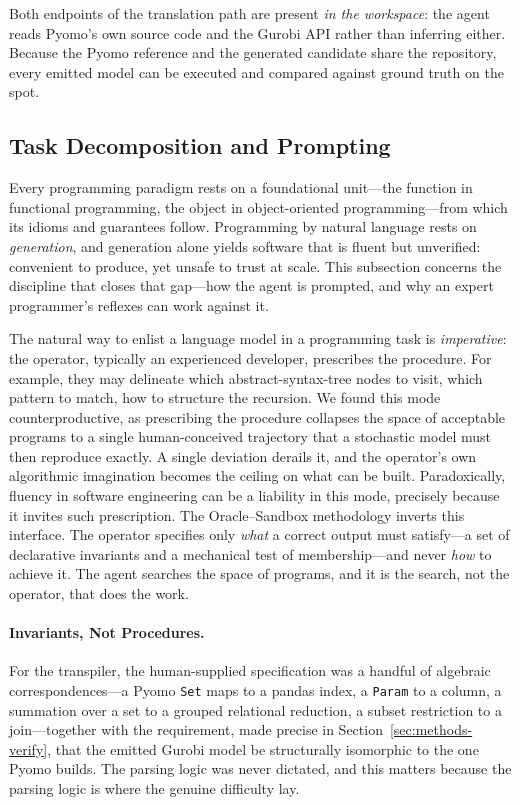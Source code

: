 \documentclass[runningheads]{llncs}
\begin{document}
Both endpoints of the translation path are present \emph{in the workspace}: the agent reads Pyomo's own source code and the Gurobi API rather than inferring either. Because the Pyomo reference and the generated candidate share the repository, every emitted model can be executed and compared against ground truth on the spot.

\subsection{Task Decomposition and Prompting}
\label{sec:methods-decomp}

Every programming paradigm rests on a foundational unit---the function in functional programming, the object in object-oriented programming---from which its idioms and guarantees follow. Programming by natural language rests on \emph{generation}, and generation alone yields software that is fluent but unverified: convenient to produce, yet unsafe to trust at scale. This subsection concerns the discipline that closes that gap---how the agent is prompted, and why an expert programmer's reflexes can work against it.

The natural way to enlist a language model in a programming task is \emph{imperative}: the operator, typically an experienced developer, prescribes the procedure. For example, they may delineate which abstract-syntax-tree nodes to visit, which pattern to match, how to structure the recursion. We found this mode counterproductive, as prescribing the procedure collapses the space of acceptable programs to a single human-conceived trajectory that a stochastic model must then reproduce exactly. A single deviation derails it, and the operator's own algorithmic imagination becomes the ceiling on what can be built. Paradoxically, fluency in software engineering can be a liability in this mode, precisely because it invites such prescription. The Oracle--Sandbox methodology inverts this interface. The operator specifies only \emph{what} a correct output must satisfy---a set of declarative invariants and a mechanical test of membership---and never \emph{how} to achieve it. The agent searches the space of programs, and it is the search, not the operator, that does the work.

\paragraph{Invariants, Not Procedures.} For the transpiler, the human-supplied specification was a handful of algebraic correspondences---a Pyomo \texttt{Set} maps to a pandas index, a \texttt{Param} to a column, a summation over a set to a grouped relational reduction, a subset restriction to a join---together with the requirement, made precise in Section~\ref{sec:methods-verify}, that the emitted Gurobi model be structurally isomorphic to the one Pyomo builds. The parsing logic was never dictated, and this matters because the parsing logic is where the genuine difficulty lay. 
\end{document}
